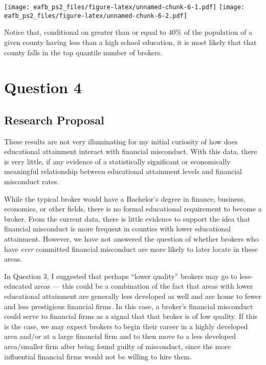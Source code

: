 \documentclass[
]{article}
\begin{document}
\texttt{[image: eafb\_ps2\_files/figure-latex/unnamed-chunk-6-1.pdf]}
\texttt{[image: eafb\_ps2\_files/figure-latex/unnamed-chunk-6-2.pdf]}

Notice that, conditional on greater than or equal to 40\% of the
population of a given county having less than a high school education,
it is most likely that that county falls in the top quantile number of
brokers.

\hypertarget{question-4}{%
\section{Question 4}\label{question-4}}

\hypertarget{research-proposal}{%
\subsection{Research Proposal}\label{research-proposal}}

These results are not very illuminating for my initial curiosity of how
does educational attainment interact with financial misconduct. With
this data, there is very little, if any evidence of a statistically
significant or economically meaningful relationship between educational
attainment levels and financial misconduct rates.

While the typical broker would have a Bachelor's degree in finance,
business, economics, or other fields, there is no formal educational
requirement to become a broker. From the current data, there is little
evidence to support the idea that financial misconduct is more frequent
in counties with lower educational attainment. However, we have not
answered the question of whether brokers who have \emph{ever} committed
financial misconduct are more likely to later locate in these areas.

In Question 3, I suggested that perhaps ``lower quality'' brokers may go
to less-educated areas --- this could be a combination of the fact that
areas with lower educational attainment are generally less developed as
well and are home to fewer and less prestigious financial firms. In this
case, a broker's financial misconduct could serve to financial firms as
a signal that that broker is of low quality. If this is the case, we may
expect brokers to begin their career in a highly developed area and/or
at a large financial firm and to then move to a less developed
area/smaller firm after being found guilty of misconduct, since the more
influential financial firms would not be willing to hire them.
\end{document}
